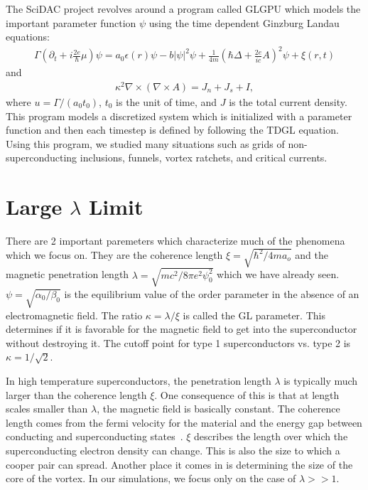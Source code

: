 The SciDAC project revolves around a program called {\sc GLGPU} which models the important parameter function $\psi$ using the time dependent Ginzburg Landau equations:
\begin{eqnarray}
\Gamma (\partial_t +i \frac{2e}{\hbar}\mu)\psi = a_0 \epsilon (r) \psi - b |\psi|^2 \psi + \frac{1}{4m} (\hbar \Delta + \frac{2e}{ic} A)^2 \psi + \xi (r,t)
\label{TDGL1}
\end{eqnarray}
and
\begin{eqnarray}
\kappa^2 \nabla \times (\nabla \times A) = J_n + J_s + I,
\label{TDGL2}
\end{eqnarray}
where $u = \Gamma/(a_0 t_0)$, $t_0$ is the unit of time, and $J$ is the total current density. This program models a discretized system which is initialized with a parameter function and then each timestep is defined by following the TDGL equation. Using this program, we studied many situations such as grids of non-superconducting inclusions, funnels, vortex ratchets, and critical currents.


\section{Large $\lambda$ Limit}
There are 2 important paremeters which characterize much of the phenomena which we focus on. They are the coherence length $\xi = \sqrt{\hbar^2/4ma_o}$ and the magnetic penetration length $\lambda = \sqrt{mc^2 / 8\pi e^2 \psi^2_0}$ which we have already seen. $\psi = \sqrt{\alpha_0/\beta_0}$ is the equilibrium value of the order parameter in the absence of an electromagnetic field. The ratio $\kappa = \lambda / \xi$ is called the GL parameter. This determines if it is favorable for the magnetic field to get into the superconductor without destroying it. The cutoff point for type 1 superconductors vs. type 2 is $\kappa = 1/\sqrt{2}$. 

 In high temperature superconductors, the penetration length $\lambda$ is typically much larger than the coherence length $\xi$. One consequence of this is that at length scales smaller than $\lambda$, the magnetic field is basically constant. The coherence length comes from the fermi velocity for the material and the energy gap between conducting and superconducting states~\cite{Kittel96}.  $\xi$ describes the length over which the superconducting electron density can change. This is also the size to which a cooper pair can spread. Another place it comes in is determining the size of the core of the vortex. In our simulations, we focus only on the case of $\lambda >> 1$.


